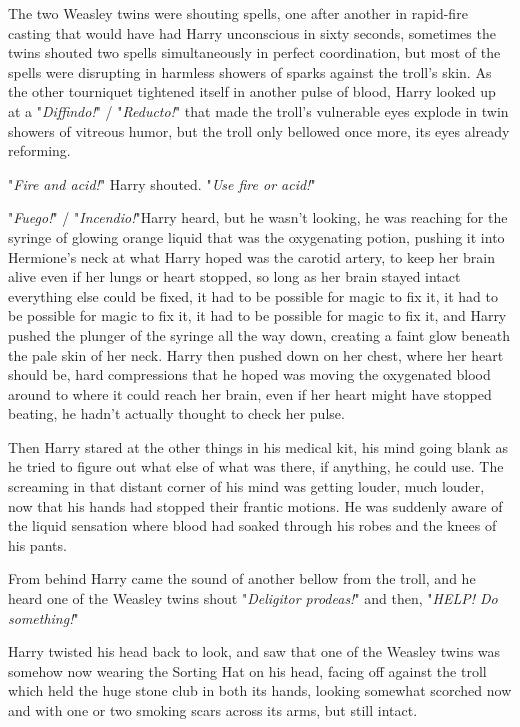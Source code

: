 The two Weasley twins were shouting spells, one after another in rapid-fire 
casting that would have had Harry unconscious in sixty seconds, sometimes the 
twins shouted two spells simultaneously in perfect coordination, but most of 
the spells were disrupting in harmless showers of sparks against the troll's 
skin. As the other tourniquet tightened itself in another pulse of blood, Harry 
looked up at a "\emph{Diffindo!}" / "\emph{Reducto!}" that made the troll's vulnerable 
eyes explode in twin showers of vitreous humor, but the troll only bellowed 
once more, its eyes already reforming.

"\emph{Fire and acid!}" Harry shouted. "\emph{Use fire or acid!}"

"\emph{Fuego!}" / "\emph{Incendio!}"Harry heard, but he wasn't looking, he was 
reaching for the syringe of glowing orange liquid that was the oxygenating 
potion, pushing it into Hermione's neck at what Harry hoped was the carotid 
artery, to keep her brain alive even if her lungs or heart stopped, so long as 
her brain stayed intact everything else could be fixed, it had to be possible 
for magic to fix it, it had to be possible for magic to fix it, it had to be 
possible for magic to fix it, and Harry pushed the plunger of the syringe all 
the way down, creating a faint glow beneath the pale skin of her neck. Harry 
then pushed down on her chest, where her heart should be, hard compressions 
that he hoped was moving the oxygenated blood around to where it could reach 
her brain, even if her heart might have stopped beating, he hadn't actually 
thought to check her pulse.

Then Harry stared at the other things in his medical kit, his mind going blank 
as he tried to figure out what else of what was there, if anything, he could 
use. The screaming in that distant corner of his mind was getting louder, much 
louder, now that his hands had stopped their frantic motions. He was suddenly 
aware of the liquid sensation where blood had soaked through his robes and the 
knees of his pants.

From behind Harry came the sound of another bellow from the troll, and he heard 
one of the Weasley twins shout "\emph{Deligitor prodeas!}" and then, 
"\emph{HELP! Do something!}"

Harry twisted his head back to look, and saw that one of the Weasley twins was 
somehow now wearing the Sorting Hat on his head, facing off against the troll 
which held the huge stone club in both its hands, looking somewhat scorched now 
and with one or two smoking scars across its arms, but still intact.


